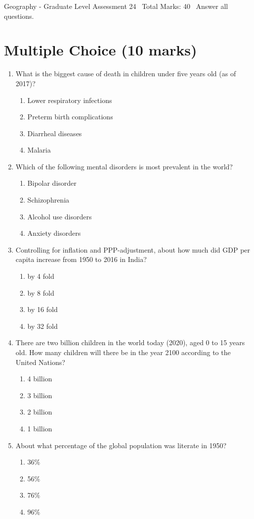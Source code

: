 \documentclass[12pt]{article}
\begin{document}
\begin{center}
Geography - Graduate Level Assessment 24 \
Total Marks: 40 \
Answer all questions.
\end{center}

\section*{Multiple Choice (10 marks)}
\begin{enumerate}[label=\arabic*.]
\item What is the biggest cause of death in children under five years old (as of 2017)?
\begin{enumerate}[label=(\alph*)]
    \item Lower respiratory infections
    \item Preterm birth complications
    \item Diarrheal diseases
    \item Malaria
\end{enumerate}
\item Which of the following mental disorders is most prevalent in the world?
\begin{enumerate}[label=(\alph*)]
    \item Bipolar disorder
    \item Schizophrenia
    \item Alcohol use disorders
    \item Anxiety disorders
\end{enumerate}
\item Controlling for inflation and PPP-adjustment, about how much did GDP per capita increase from 1950 to 2016 in India?
\begin{enumerate}[label=(\alph*)]
    \item by 4 fold
    \item by 8 fold
    \item by 16 fold
    \item by 32 fold
\end{enumerate}
\item There are two billion children in the world today (2020), aged 0 to 15 years old. How many children will there be in the year 2100 according to the United Nations?
\begin{enumerate}[label=(\alph*)]
    \item 4 billion
    \item 3 billion
    \item 2 billion
    \item 1 billion
\end{enumerate}
\item About what percentage of the global population was literate in 1950?
\begin{enumerate}[label=(\alph*)]
    \item 36\%
    \item 56\%
    \item 76\%
    \item 96\%
\end{enumerate}
\end{enumerate}
\end{document}
